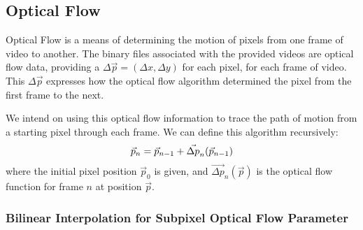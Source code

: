 \subsection{Optical Flow}
Optical Flow is a means of determining the motion of pixels from one frame of video to another. The binary files associated with the provided videos are optical flow data, providing a $\Delta \vec{p} = (\Delta x, \Delta y)$ for each pixel, for each frame of video. This $\Delta \vec{p}$ expresses how the optical flow algorithm determined the pixel from the first frame to the next.
\par We intend on using this optical flow information to trace the path of motion from a starting pixel through each frame. We can define this algorithm recursively:
\begin{equation}
    \vec{p}_n = \vec{p}_{n-1} + \vec{\Delta p}_n(\vec{p}_{n-1}) \\
\end{equation}
where the initial pixel position $\vec{p}_0$ is given, and $\vec{\Delta p}_n(\vec{p})$ is the optical flow function for frame $n$ at position $\vec{p}$.

\subsubsection{Bilinear Interpolation for Subpixel Optical Flow Parameter}

